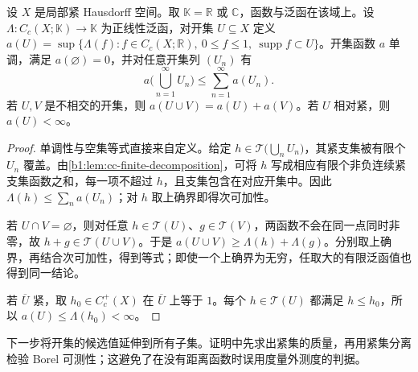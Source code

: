 \begin{lemma}\label{b1:lem:positive-functional-open-content}
设 \(X\) 是局部紧 Hausdorff 空间。取 \(\mathbb K=\mathbb R\) 或 \(\mathbb C\)，函数与泛函在该域上。设 \(\Lambda:C_c(X;\mathbb K)\to\mathbb K\) 为正线性泛函，对开集 \(U\subseteq X\) 定义 \(a(U)=\sup\{\Lambda(f):f\in C_c(X;\mathbb R),\ 0\le f\le1,\ \operatorname{supp}f\subset U\}\)。开集函数 \(a\) 单调，满足 \(a(\varnothing)=0\)，并对任意开集列 \((U_n)\) 有
\[
 a\biggl(\bigcup_{n=1}^{\infty}U_n\biggr)
 \leq\sum_{n=1}^{\infty}a(U_n).
\]
若 \(U,V\) 是不相交的开集，则 \(a(U\cup V)=a(U)+a(V)\)。若 \(U\) 相对紧，则 \(a(U)<\infty\)。
\end{lemma}
\begin{proof}
单调性与空集等式直接来自定义。给定 \(h\in\mathcal T\bigl(\bigcup_nU_n\bigr)\)，其紧支集被有限个 \(U_n\) 覆盖。由\cref{b1:lem:cc-finite-decomposition}，可将 \(h\) 写成相应有限个非负连续紧支集函数之和，每一项不超过 \(h\)，且支集包含在对应开集中。因此 \(\Lambda(h)\leq\sum_na(U_n)\)；对 \(h\) 取上确界即得次可加性。

若 \(U\cap V=\varnothing\)，则对任意 \(h\in\mathcal T(U)\)、\(g\in\mathcal T(V)\)，两函数不会在同一点同时非零，故 \(h+g\in\mathcal T(U\cup V)\)。于是 \(a(U\cup V)\geq\Lambda(h)+\Lambda(g)\)。分别取上确界，再结合次可加性，得到等式；即使一个上确界为无穷，任取大的有限泛函值也得到同一结论。

若 \(\overline U\) 紧，取 \(h_0\in C_c^+(X)\) 在 \(\overline U\) 上等于 \(1\)。每个 \(h\in\mathcal T(U)\) 都满足 \(h\leq h_0\)，所以 \(a(U)\leq\Lambda(h_0)<\infty\)。
\end{proof}

下一步将开集的候选值延伸到所有子集。证明中先求出紧集的质量，再用紧集分离检验 Borel 可测性；这避免了在没有距离函数时误用度量外测度的判据。

